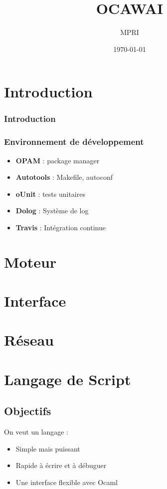 \documentclass[french,xcolor={usenames,dvipsnames}]{beamer}
\author{MPRI}
\date{\today}
\title{OCAWAI}
\newenvironment{bitemize}{\begin{itemize}[<+->]}{\end{itemize}}
\begin{document}
\begin{frame}
\titlepage
\end{frame}


\section{Introduction}

\begin{frame}
\frametitle{Introduction}

\end{frame}

\begin{frame}
\frametitle{Environnement de développement}

\begin{bitemize}
  \item \textbf{OPAM} : package manager
  \item \textbf{Autotools} : Makefile, autoconf
  \item \textbf{oUnit} : tests unitaires
  \item \textbf{Dolog} : Système de log
  \item \textbf{Travis} : Intégration continue
\end{bitemize}
\end{frame}

\section{Moteur}

\section{Interface}

\section{Réseau}

\section{Langage de Script}

\subsection{Objectifs}

\begin{frame}
  On veut un langage : 
  \vspace{10pt}
  \begin{itemize}
    \item Simple mais puissant

    \vspace{10pt}

    \item Rapide à écrire et à débuguer

    \vspace{10pt}

    \item Une interface flexible avec Ocaml
  \end{itemize}
\end{frame}
\end{document}
